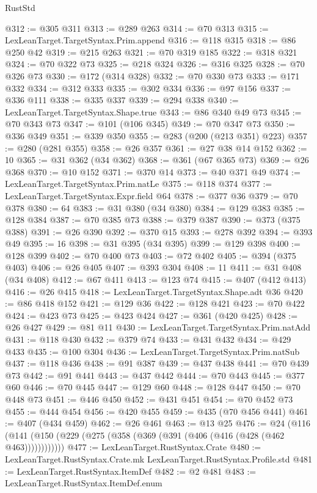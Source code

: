\begin{lexlean}{RustStd}
\begin{coremodule}
@312 := @305 @311
@313 := @289 @263
@314 := @70 @313
@315 := LexLeanTarget.TargetSyntax.Prim.append
@316 := @118 @315
@318 := @86 @250 @42
@319 := @215 @263
@321 := @70 @319 @185
@322 := @318 @321
@324 := @70 @322 @73
@325 := @218 @324
@326 := @316 @325
@328 := @70 @326 @73
@330 := @172 (@314 @328)
@332 := @70 @330 @73
@333 := @171 @332
@334 := @312 @333
@335 := @302 @334
@336 := @97 @156
@337 := @336 @111
@338 := @335 @337
@339 := @294 @338
@340 := LexLeanTarget.TargetSyntax.Shape.true
@343 := @86 @340 @49 @73
@345 := @70 @343 @73
@347 := @101 (@106 @345)
@349 := @70 @347 @73
@350 := @336 @349
@351 := @339 @350
@355 := @283 (@200 (@213 @351) @223)
@357 := @280 (@281 @355)
@358 := @26 @357
@361 := @27 @38 @14 @152
@362 := 10
@365 := @31 @362 (@34 @362)
@368 := @361 (@67 @365 @73)
@369 := @26 @368
@370 := @10 @152
@371 := @370 @14
@373 := @40 @371 @49
@374 := LexLeanTarget.TargetSyntax.Prim.natLe
@375 := @118 @374
@377 := LexLeanTarget.TargetSyntax.Expr.field @64
@378 := @377 @36
@379 := @70 @378
@380 := 64
@383 := @31 @380 (@34 @380)
@384 := @129 @383
@385 := @128 @384
@387 := @70 @385 @73
@388 := @379 @387
@390 := @373 (@375 @388)
@391 := @26 @390
@392 := @370 @15
@393 := @278 @392
@394 := @393 @49
@395 := 16
@398 := @31 @395 (@34 @395)
@399 := @129 @398
@400 := @128 @399
@402 := @70 @400 @73
@403 := @72 @402
@405 := @394 (@375 @403)
@406 := @26 @405
@407 := @393 @304
@408 := 11
@411 := @31 @408 (@34 @408)
@412 := @67 @411
@413 := @123 @74
@415 := @407 (@412 @413)
@416 := @26 @415
@418 := LexLeanTarget.TargetSyntax.Shape.adt @36
@420 := @86 @418 @152
@421 := @129 @36
@422 := @128 @421
@423 := @70 @422
@424 := @423 @73
@425 := @423 @424
@427 := @361 (@420 @425)
@428 := @26 @427
@429 := @81 @11
@430 := LexLeanTarget.TargetSyntax.Prim.natAdd
@431 := @118 @430
@432 := @379 @74
@433 := @431 @432
@434 := @429 @433
@435 := @100 @304
@436 := LexLeanTarget.TargetSyntax.Prim.natSub
@437 := @118 @436
@438 := @91 @387
@439 := @437 @438
@441 := @70 @439 @73
@442 := @91 @441
@443 := @437 @442
@444 := @70 @443
@445 := @377 @60
@446 := @70 @445
@447 := @129 @60
@448 := @128 @447
@450 := @70 @448 @73
@451 := @446 @450
@452 := @431 @451
@454 := @70 @452 @73
@455 := @444 @454
@456 := @420 @455
@459 := @435 (@70 @456 @441)
@461 := @407 (@434 @459)
@462 := @26 @461
@463 := @13 @25
@476 := @24 (@116 (@141 (@150 (@229 (@275 (@358 (@369 (@391 (@406 (@416 (@428 (@462 @463))))))))))))
@477 := LexLeanTarget.RustSyntax.Crate
@480 := LexLeanTarget.RustSyntax.Crate.mk LexLeanTarget.RustSyntax.Profile.std
@481 := LexLeanTarget.RustSyntax.ItemDef
@482 := @2 @481
@483 := LexLeanTarget.RustSyntax.ItemDef.enum

\end{coremodule}
\end{lexlean}
